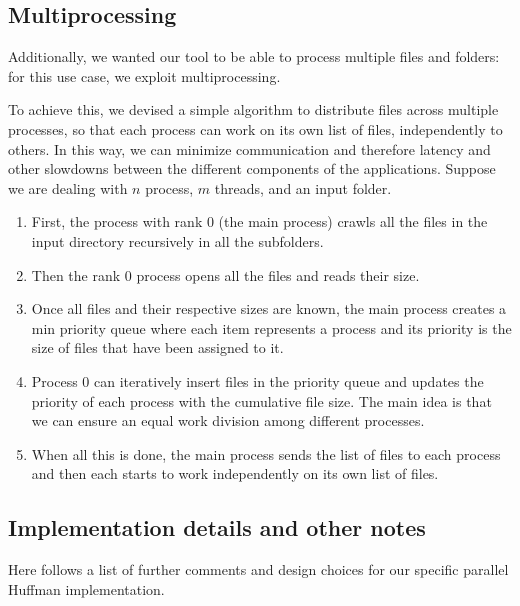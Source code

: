 \subsection{Multiprocessing}

Additionally, we wanted our tool to be able to process multiple files and folders: for this use case, we exploit multiprocessing.

To achieve this, we devised a simple algorithm to distribute files across multiple processes, so that each process can work on its own list of files, independently to others. In this way, we can minimize communication and therefore latency and other slowdowns between the different components of the applications. Suppose we are dealing with \(n\) process, \(m\) threads, and an input folder.

\begin{enumerate}
	\item First, the process with rank 0 (the main process) crawls all the files in the input directory recursively in all the subfolders.
	\item Then the rank 0 process opens all the files and reads their size.
	\item Once all files and their respective sizes are known, the main process creates a min priority queue where each item represents a process and its priority is the size of files that have been assigned to it.
	\item Process 0 can iteratively insert files in the priority queue and updates the priority of each process with the cumulative file size. The main idea is that we can ensure an equal work division among different processes.
	\item When all this is done, the main process sends the list of files to each process and then each starts to work independently on its own list of files.
\end{enumerate}

\subsection{Implementation details and other notes}
Here follows a list of further comments and design choices for our specific parallel Huffman implementation. 

